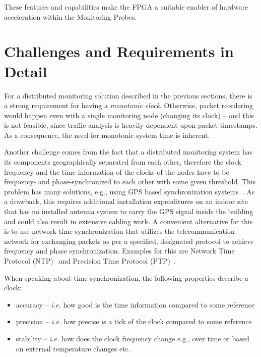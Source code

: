 \documentclass[journal]{IEEEtran}
\begin{document}
These features and capabilities make the FPGA a suitable enabler of hardware acceleration within the Monitoring Probes.

\section{Challenges and Requirements in Detail}\label{sec:Challanges}


For a distributed monitoring solution described in the previous sections, there is a strong requirement for having
a \emph{monotonic clock}. Otherwise, packet reordering would happen even with a single monitoring node (changing its clock) -- and this is not feasible, since traffic analysis is heavily dependent upon packet timestamps. As a consequence, the need for monotonic system time is inherent.

Another challenge comes from the fact that a distributed monitoring system has its components geographically
separated from each other, therefore the clock frequency and the time information of the clocks of the nodes have to be
frequency- and phase-synchronized to each other with some given threshold. This problem has many solutions, e.g., using
GPS based synchronization
systems~\cite{GPS-CLOCK}. As a drawback, this requires additional installation expenditures on an indoor site that has no installed
antenna system to carry the GPS signal inside the building and could also result in extensive cabling work.
A convenient alternative for this is to use network time synchronization that utilizes the telecommunication network for
exchanging packets as per a specified, designated protocol to achieve frequency and phase synchronization. Examples for this
are Network Time Protocol (NTP)~\cite{NTP} and Precision Time Protocol (PTP)~\cite{PTP}.

When speaking about time synchronization, the following properties describe a clock:
\begin{itemize}
    \item accuracy -- \emph{i.e.} how good is the time information compared to some reference
    \item precision -- \emph{i.e.} how precise is a tick of the clock compared to some reference
    \item stability -- \emph{i.e.} how does the clock frequency change  e.g., over time or based on external
          temperature changes etc.
\end{itemize}
\end{document}
